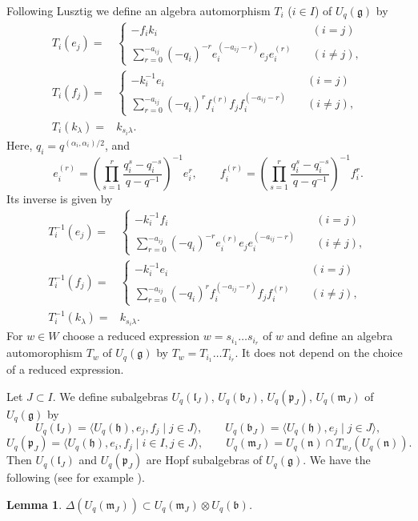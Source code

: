 \documentclass[a4paper, 12pt, leqno]{amsart}
\newtheorem{lemma}{{\sc Lemma}}[section]
\theoremstyle{definition}
\numberwithin{equation}{section}
\def\Gb{{\mathfrak{b}}}
\def\Gg{{\mathfrak{g}}}
\def\Gh{{\mathfrak{h}}}
\def\Gl{{\mathfrak{l}}}
\def\Gm{{\mathfrak{m}}}
\def\Gn{{\mathfrak{n}}}
\def\Gp{{\mathfrak{p}}}
\begin{document}
Following Lusztig \cite{Lb} we define an algebra automorphism $T_i$ ($i\in I$) of $U_q(\Gg)$ by
\begin{align*}
T_i(e_j)=&
\begin{cases}
-f_ik_i\quad &(i=j)
\\
\sum_{r=0}^{-a_{ij}}(-q_i)^{-r}e_i^{(-a_{ij}-r)}e_je_i^{(r)}
\quad &(i\ne j),
\end{cases}
\\
T_i(f_j)=&
\begin{cases}
-k_i^{-1}e_i\quad &(i=j)
\\
\sum_{r=0}^{-a_{ij}}(-q_i)^{r}f_i^{(r)}f_jf_i^{(-a_{ij}-r)}
\quad &(i\ne j),
\end{cases}
\\
T_i(k_\lambda)=&k_{s_i\lambda}.
\end{align*}
Here, $q_i=q^{(\alpha_i,\alpha_i)/2}$, and 
\[
e_i^{(r)}=
\left(\prod_{s=1}^r\frac{q_i^s-q_i^{-s}}{q-q^{-1}}\right)^{-1}
e_i^r,
\qquad
f_i^{(r)}=
\left(\prod_{s=1}^r\frac{q_i^s-q_i^{-s}}{q-q^{-1}}\right)^{-1}
f_i^r.
\]
Its inverse is given by
\begin{align*}
T_i^{-1}(e_j)=&
\begin{cases}
-k_i^{-1}f_i\quad &(i=j)
\\
\sum_{r=0}^{-a_{ij}}(-q_i)^{-r}e_i^{(r)}e_je_i^{(-a_{ij}-r)}
\quad &(i\ne j),
\end{cases}
\\
T_i^{-1}(f_j)=&
\begin{cases}
-k_i^{-1}e_i\quad &(i=j)
\\
\sum_{r=0}^{-a_{ij}}(-q_i)^{r}f_i^{(-a_{ij}-r)}f_jf_i^{(r)}
\quad &(i\ne j),
\end{cases}
\\
T_i^{-1}(k_\lambda)=&k_{s_i\lambda}.
\end{align*}
For $w\in W$ choose a reduced expression 
$w=s_{i_1}\dots s_{i_r}$
of $w$ and define an algebra automorophism $T_w$ of $U_q(\Gg)$ by 
$
T_w=T_{i_1}\dots T_{i_r}.
$
It does not depend on the choice of a reduced expression.

Let $J\subset I$.
We define subalgebras $U_q(\Gl_J)$, $U_q(\Gb_J)$, $U_q(\Gp_J)$, $U_q(\Gm_J)$ of $U_q(\Gg)$ by
\[
U_q(\Gl_J)=
\langle
U_q(\Gh), e_j, f_j\mid j\in J\rangle,
\qquad
U_q(\Gb_J)=
\langle
U_q(\Gh), e_j\mid j\in J\rangle,
\]
\[
U_q(\Gp_J)=
\langle
U_q(\Gh), e_i, f_j\mid i\in I, j\in J\rangle,
\qquad
U_q(\Gm_J)=U_q(\Gn)\cap T_{w_J}(U_q(\Gn)).
\]
Then $U_q(\Gl_J)$ and $U_q(\Gp_J)$ are Hopf subalgebras of $U_q(\Gg)$.
We have the following (see for example \cite[Lemma 2.8]{TM}).
\begin{lemma}
\label{lem:DUm}
$\Delta(U_q(\Gm_J))\subset U_q(\Gm_J)\otimes U_q(\Gb)$.
\end{lemma}
\end{document}
